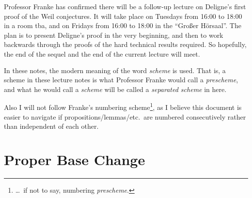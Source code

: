 \documentclass[a4paper, 10pt, oneside, DIV=9, chapterprefix=true, numbers=enddot, bibliography=totoc]{scrbook}
\DeclareRobustCommand{\Attention}{\tikz[baseline, anchor=base]\node[draw, regular polygon, regular polygon sides=3, rounded corners=2, thick, inner sep=-0.25pt] at (0,0) {\textbf{!}};}
\begin{document}
Professor Franke has confirmed there will be a follow-up lecture on Deligne's first proof of the Weil conjectures. It will take place on Tuesdays from 16:00 to 18:00 in a room tba, and on Fridays from  16:00 to 18:00 in the \enquote{Großer Hörsaal}. The plan is to present Deligne's proof in the very beginning, and then to work backwards through the proofs of the hard technical results required. So hopefully, the end of the sequel and the end of the current lecture will meet.

In these notes, the modern meaning of the word \emph{scheme} is used. That is, a scheme in these lecture notes is what Professor Franke would call a \emph{prescheme}, and what he would call a \emph{scheme} will be called a \emph{separated scheme} in here.

Also I will not follow Franke's numbering scheme\footnote{\ldots\ if not to say, numbering \emph{prescheme}.}, as I believe this document is easier to navigate if propositions/lemmas/etc.\ are numbered consecutively rather than independent of each other. 


\mainmatter{}







\chapter{Proper Base Change}
\end{document}
